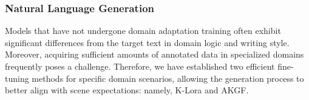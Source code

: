 \documentclass{article}
\begin{document}







\subsubsection{Natural Language Generation}
Models that have not undergone domain adaptation training often exhibit significant differences from the target text in domain logic and writing style. Moreover, acquiring sufficient amounts of annotated data in specialized domains frequently poses a challenge. Therefore, we have established two efficient fine-tuning methods for specific domain scenarios, allowing the generation process to better align with scene expectations: namely, K-Lora and AKGF.
\end{document}
